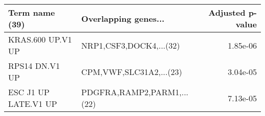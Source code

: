 \begin{tabular}{llr}
\toprule
      Term name (39) &       Overlapping genes... &  Adjusted p-value \\
\midrule
   KRAS.600 UP.V1 UP &    NRP1,CSF3,DOCK4,...(32) &          1.85e-06 \\
      RPS14 DN.V1 UP &    CPM,VWF,SLC31A2,...(23) &          3.04e-05 \\
ESC J1 UP LATE.V1 UP & PDGFRA,RAMP2,PARM1,...(22) &          7.13e-05 \\
\bottomrule
\end{tabular}
